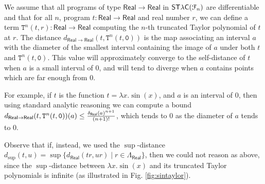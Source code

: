 \begin{example}

We assume that all programs of type $\mathsf{Real}\to\mathsf{Real}$ in $\mathsf{ST\lambda C}(\mathcal F_{n})$ are differentiable and that for all $n$, program $t:\mathsf{Real}\to\mathsf{Real}$ and real number $r$, we can define a term 
$\mathtt T^{n}( t, r):\mathsf{Real}\to\mathsf{Real}$ computing the $n$-th truncated Taylor polynomial of $t$ at $r$. 
The distance 
$d_{\mathsf{Real}\to\mathsf{Real}}(t, \mathtt T^{n}( t,\mathtt 0 ))$ is the map associating an interval $a$ with the diameter of the smallest interval containing the image of $a$ under both $t$ and $\mathtt T^{n}( t,\mathtt 0 )$. 
This value will approximately converge to the self-distance of $t$ when $a$ is a small interval of $0$, and will tend to diverge when $a$ contains points which are far enough from 0. 

For example, if $t$ is the function $t=\lambda x.\sin(x)$, and $a$ is an interval of $0$, then using standard analytic reasoning we can compute a bound
$d_{\mathsf{Real}\to \mathsf{Real}}(t, \mathtt T^{n}( t,\mathtt 0 ))(a  )\leq \frac{\delta_{\mathsf{Real}}(a)^{n+1}}{(n+1)!} $, which tends to $0$ as the diameter of $a$ tends to $0$.

Observe that if, instead, we used the $\sup$-distance $d_{\sup}(t,u)= \sup\{d_{\mathsf{Real}}(tr, ur)\mid r\in \Lambda_{\mathsf{Real}}\}$, then we could not reason as above, since  the $\sup$-distance between $\lambda x.\sin(x)$ and its  truncated Taylor polynomials is infinite (as illustrated in Fig. \ref{fig:sintaylor}).  

  
\end{example}

